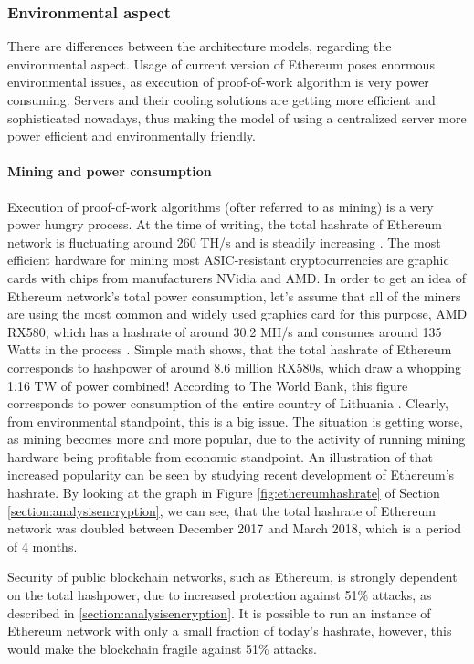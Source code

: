 \subsubsection{Environmental aspect} \label{analysis:environmental}

There are differences between the architecture models, regarding the environmental aspect. Usage of current version of Ethereum poses enormous environmental issues, as execution of proof-of-work algorithm is very power consuming. Servers and their cooling solutions are getting more efficient and sophisticated nowadays, thus making the model of using a centralized server more power efficient and environmentally friendly.

\paragraph{Mining and power consumption}
Execution of proof-of-work algorithms (ofter referred to as mining) is a very power hungry process. At the time of writing, the total hashrate of Ethereum network is fluctuating around 260 TH/s and is steadily increasing \citep{ethhashrate}. The most efficient hardware for mining most ASIC-resistant cryptocurrencies are graphic cards with chips from manufacturers NVidia and AMD. In order to get an idea of Ethereum network's total power consumption, let's assume that all of the miners are using the most common and widely used graphics card for this purpose, AMD RX580, which has a hashrate of around 30.2 MH/s and consumes around 135 Watts in the process \citep{whattomine}. Simple math shows, that the total hashrate of Ethereum corresponds to hashpower of around 8.6 million RX580s, which draw a whopping 1.16 TW of power combined! According to The World Bank, this figure corresponds to power consumption of the entire country of Lithuania \citep{worldpowerconsumption}. Clearly, from environmental standpoint, this is a big issue. The situation is getting worse, as mining becomes more and more popular, due to the activity of running mining hardware being profitable from economic standpoint. An illustration of that increased popularity can be seen by studying recent development of Ethereum's hashrate. By looking at the graph in Figure \ref{fig:ethereumhashrate} of Section \ref{section:analysisencryption}, we can see, that the total hashrate of Ethereum network was doubled between December 2017 and March 2018, which is a period of 4 months.

Security of public blockchain networks, such as Ethereum, is strongly dependent on the total hashpower, due to increased protection against 51\% attacks, as described in \ref{section:analysisencryption}. It is possible to run an instance of Ethereum network with only a small fraction of today's hashrate, however, this would make the blockchain fragile against 51\% attacks.

